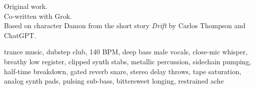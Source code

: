 

\begin{notes}
Original work.\\
Co-written with Grok.\\
Based on character Damon from the short story \emph{Drift} by Carlos Thompson and ChatGPT.
\end{notes}

\begin{style}
trance music, dubstep club, 140 BPM, deep bass male vocals, close-mic whisper, breathy low register, clipped synth stabs, metallic percussion, sidechain pumping, half-time breakdown, gated reverb snare, stereo delay throws, tape saturation, analog synth pads, pulsing sub-bass, bittersweet longing, restrained ache
\end{style}

